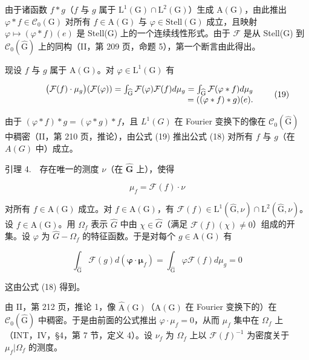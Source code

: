 由于诸函数 \(f * g\)（\(f\) 与 \(g\) 属于 \(\mathrm{L}^1(\mathrm{G}) \cap \mathrm{L}^2(\mathrm{G})\)）生成 \(\mathrm{A}(\mathrm{G})\)，由此推出 \(\varphi * f \in \mathcal{C}_0(\mathrm{G})\) 对所有 \(f \in \mathrm{A}(\mathrm{G})\) 与 \(\varphi \in \mathrm{Stell}(\mathrm{G})\) 成立，且映射 \(\varphi \mapsto (\varphi * f)(e)\) 是 Stell(G) 上的一个连续线性形式。由于 \(\mathcal{F}\) 是从 Stell(G) 到 \(\mathcal{C}_{0}(\widehat{\mathrm{G}})\) 上的同构（II，第 209 页，命题 5），第一个断言由此得出。

现设 \(f\) 与 \(g\) 属于 \(\mathrm{A}(\mathrm{G})\)。对 \(\varphi \in \mathrm{L}^1 (\mathrm{G})\) 有

\[
\begin{array}{r l r} & & {\big (\mathcal {F} (f) \cdot \mu_ {g} \big) (\mathcal {F} (\varphi)) = \int_ {\widehat {\mathrm{G}}} \mathcal {F} (\varphi) \mathcal {F} (f) d \mu_ {g} = \int_ {\widehat {\mathrm{G}}} \mathcal {F} (\varphi * f) d \mu_ {g}} \\ & & {= ((\varphi * f) * g) (e).} \end{array}\tag{19}
\]

由于 \((\varphi*f)*g=(\varphi*g)*f\)，且 \(L^{1}(G)\) 在 Fourier 变换下的像在 \(\mathcal{C}_{0}(\widehat{\mathrm{G}})\) 中稠密（II，第 210 页，推论），由公式 (19) 推出公式 (18) 对所有 \(f\) 与 \(g\)（在 \(A(G)\) 中）成立。

引理 4.　存在唯一的测度 \(\nu\)（在 \(\widehat{\mathbf{G}}\) 上），使得

\[
\mu_ {f} = \mathcal {F} (f) \cdot \nu
\]

对所有 \(f \in \mathrm{A}(\mathrm{G})\) 成立。对 \(f \in \mathrm{A}(\mathrm{G})\)，有 \(\mathcal{F}(f) \in \mathrm{L}^{1}(\widehat{\mathrm{G}}, \nu) \cap \mathrm{L}^{2}(\widehat{\mathrm{G}}, \nu)\)。设 \(f \in \mathrm{A}(\mathrm{G})\)。用 \(\Omega_{f}\) 表示 \(\widehat{G}\) 中由 \(\chi \in \widehat{G}\)（满足 \(\mathcal{F}(f)(\chi) \neq 0\)）组成的开集。设 \(\varphi\) 为 \(\widehat{G} - \Omega_{f}\) 的特征函数。于是对每个 \(g \in \mathrm{A}(\mathrm{G})\) 有

\[
\int_ {\widehat {\mathrm{G}}} \mathcal {F} (g) d (\boldsymbol {\varphi} \cdot \boldsymbol {\mu} _ {f}) = \int_ {\widehat {\mathrm{G}}} \varphi \mathcal {F} (f) d \mu_ {g} = 0
\]

这由公式 (18) 得到。

由 II，第 212 页，推论 1，像 \(\widehat{\mathrm{A}}(\mathrm{G})\)（\(\mathrm{A}(\mathrm{G})\) 在 Fourier 变换下的）在 \(\mathcal{C}_0(\widehat{\mathrm{G}})\) 中稠密。于是由前面的公式推出 \(\varphi \cdot \mu_f = 0\)，从而 \(\mu_f\) 集中在 \(\Omega_f\) 上（INT，IV，§4，第 7 节，定义 4）。设 \(\nu_f\) 为 \(\Omega_f\) 上以 \(\mathcal{F}(f)^{-1}\) 为密度关于 \(\mu_f|\Omega_f\) 的测度。

